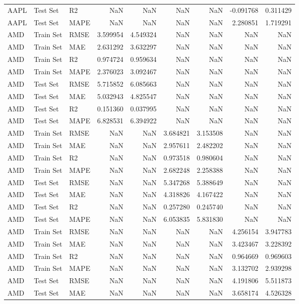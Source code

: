 \begin{tabular}{lllrrrrrr}
AAPL & Test Set & R2 & NaN & NaN & NaN & NaN & -0.091768 & 0.311429 \\
AAPL & Test Set & MAPE & NaN & NaN & NaN & NaN & 2.280851 & 1.719291 \\
AMD & Train Set & RMSE & 3.599954 & 4.549324 & NaN & NaN & NaN & NaN \\
AMD & Train Set & MAE & 2.631292 & 3.632297 & NaN & NaN & NaN & NaN \\
AMD & Train Set & R2 & 0.974724 & 0.959634 & NaN & NaN & NaN & NaN \\
AMD & Train Set & MAPE & 2.376023 & 3.092467 & NaN & NaN & NaN & NaN \\
AMD & Test Set & RMSE & 5.715852 & 6.085663 & NaN & NaN & NaN & NaN \\
AMD & Test Set & MAE & 5.032943 & 4.825547 & NaN & NaN & NaN & NaN \\
AMD & Test Set & R2 & 0.151360 & 0.037995 & NaN & NaN & NaN & NaN \\
AMD & Test Set & MAPE & 6.828531 & 6.394922 & NaN & NaN & NaN & NaN \\
AMD & Train Set & RMSE & NaN & NaN & 3.684821 & 3.153508 & NaN & NaN \\
AMD & Train Set & MAE & NaN & NaN & 2.957611 & 2.482202 & NaN & NaN \\
AMD & Train Set & R2 & NaN & NaN & 0.973518 & 0.980604 & NaN & NaN \\
AMD & Train Set & MAPE & NaN & NaN & 2.682248 & 2.258388 & NaN & NaN \\
AMD & Test Set & RMSE & NaN & NaN & 5.347268 & 5.388649 & NaN & NaN \\
AMD & Test Set & MAE & NaN & NaN & 4.318826 & 4.167422 & NaN & NaN \\
AMD & Test Set & R2 & NaN & NaN & 0.257280 & 0.245740 & NaN & NaN \\
AMD & Test Set & MAPE & NaN & NaN & 6.053835 & 5.831830 & NaN & NaN \\
AMD & Train Set & RMSE & NaN & NaN & NaN & NaN & 4.256154 & 3.947783 \\
AMD & Train Set & MAE & NaN & NaN & NaN & NaN & 3.423467 & 3.228392 \\
AMD & Train Set & R2 & NaN & NaN & NaN & NaN & 0.964669 & 0.969603 \\
AMD & Train Set & MAPE & NaN & NaN & NaN & NaN & 3.132702 & 2.939298 \\
AMD & Test Set & RMSE & NaN & NaN & NaN & NaN & 4.191806 & 5.511873 \\
AMD & Test Set & MAE & NaN & NaN & NaN & NaN & 3.658174 & 4.526328 \\

\end{tabular}
